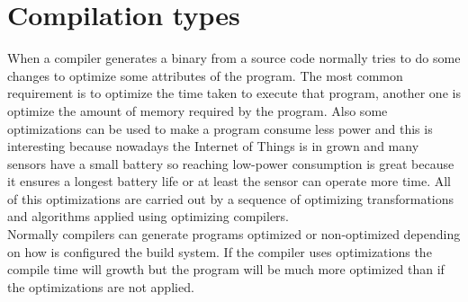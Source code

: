 \section{Compilation types}\label{S:PERF-comptypes}
When a compiler generates a binary from a source code normally tries to do some changes to optimize some attributes of the program. The most common requirement is to optimize the time taken to execute that program, another one is optimize the amount of memory required by the program. Also some optimizations can be used to make a program consume less power and this is interesting because nowadays the Internet of Things is in grown and many sensors have a small battery so reaching low-power consumption is great because it ensures a longest battery life or at least the sensor can operate more time. All of this optimizations are carried out by a sequence of optimizing transformations and algorithms applied using optimizing compilers.
\\
Normally compilers can generate programs optimized or non-optimized depending on how is configured the build system. If the compiler uses optimizations the compile time will growth but the program will be much more optimized than if the optimizations are not applied.
